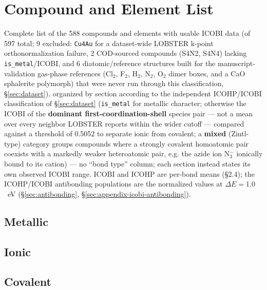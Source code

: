 \documentclass[11pt,a4paper]{article}
\begin{document}
{\scriptsize

}

\section{Compound and Element List}
\label{sec:appendix-master-list}

Complete list of the 588 compounds and elements with usable ICOBI data
(of 597 total; 9 excluded: \texttt{Cu4Au} for a dataset-wide LOBSTER
k-point orthonormalization failure, 2 COD-sourced compounds (S4N2, S4N4)
lacking \texttt{is\_metal}/ICOBI, and 6 diatomic/reference structures
built for the manuscript-validation gas-phase references (Cl$_2$,
F$_2$, H$_2$, N$_2$, O$_2$ dimer boxes, and a CaO sphalerite polymorph)
that were never run through this classification, \S\ref{sec:dataset}),
organized by section according to the independent
ICOHP/ICOBI classification of \S\ref{sec:dataset} (\texttt{is\_metal}
for metallic character; otherwise the ICOBI of the \textbf{dominant
first-coordination-shell} species pair --- not a mean over every
neighbor LOBSTER reports within the wider cutoff ---
compared against a threshold of 0.5052 to separate ionic from covalent;
a \textbf{mixed} (Zintl-type) category groups compounds where a
strongly covalent homoatomic pair coexists with a markedly weaker
heteroatomic pair, e.g. the azide ion N$_3^-$ ionically bound to its
cation) --- no ``bond type'' column; each section instead states its
own observed ICOBI range. ICOBI and ICOHP
are per-bond means (\S2.4); the ICOHP/ICOBI antibonding populations are
the normalized values at $\Delta E=1.0$~eV (\S\ref{sec:antibonding},
\S\ref{sec:appendix-icobi-antibonding}).

\subsection{Metallic}

{\small

}

\subsection{Ionic}

{\small

}

\subsection{Covalent}
\end{document}
